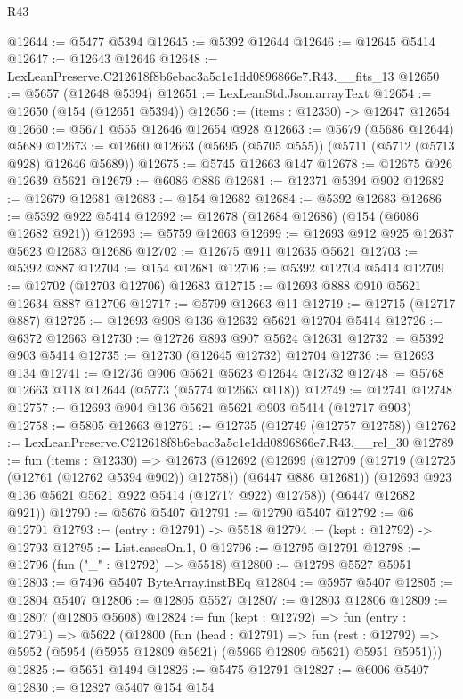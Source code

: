 \begin{lexlean}{R43}
\begin{coremodule}
@12644 := @5477 @5394
@12645 := @5392 @12644
@12646 := @12645 @5414
@12647 := @12643 @12646
@12648 := LexLeanPreserve.C212618f8b6ebac3a5c1e1dd0896866e7.R43.__fits_13
@12650 := @5657 (@12648 @5394)
@12651 := LexLeanStd.Json.arrayText
@12654 := @12650 (@154 (@12651 @5394))
@12656 := (items : @12330) -> @12647 @12654
@12660 := @5671 @555 @12646 @12654 @928
@12663 := @5679 (@5686 @12644) @5689
@12673 := @12660 @12663 (@5695 (@5705 @555)) (@5711 (@5712 (@5713 @928) @12646 @5689))
@12675 := @5745 @12663 @147
@12678 := @12675 @926 @12639 @5621
@12679 := @6086 @886
@12681 := @12371 @5394 @902
@12682 := @12679 @12681
@12683 := @154 @12682
@12684 := @5392 @12683
@12686 := @5392 @922 @5414
@12692 := @12678 (@12684 @12686) (@154 (@6086 @12682 @921))
@12693 := @5759 @12663
@12699 := @12693 @912 @925 @12637 @5623 @12683 @12686
@12702 := @12675 @911 @12635 @5621
@12703 := @5392 @887
@12704 := @154 @12681
@12706 := @5392 @12704 @5414
@12709 := @12702 (@12703 @12706) @12683
@12715 := @12693 @888 @910 @5621 @12634 @887 @12706
@12717 := @5799 @12663 @11
@12719 := @12715 (@12717 @887)
@12725 := @12693 @908 @136 @12632 @5621 @12704 @5414
@12726 := @6372 @12663
@12730 := @12726 @893 @907 @5624 @12631
@12732 := @5392 @903 @5414
@12735 := @12730 (@12645 @12732) @12704
@12736 := @12693 @134
@12741 := @12736 @906 @5621 @5623 @12644 @12732
@12748 := @5768 @12663 @118 @12644 (@5773 (@5774 @12663 @118))
@12749 := @12741 @12748
@12757 := @12693 @904 @136 @5621 @5621 @903 @5414 (@12717 @903)
@12758 := @5805 @12663
@12761 := @12735 (@12749 (@12757 @12758))
@12762 := LexLeanPreserve.C212618f8b6ebac3a5c1e1dd0896866e7.R43.__rel_30
@12789 := fun (items : @12330) =>
  @12673
    (@12692
      (@12699
        (@12709 (@12719 (@12725 (@12761 (@12762 @5394 @902)) @12758)) (@6447 @886 @12681))
        (@12693 @923 @136 @5621 @5621 @922 @5414 (@12717 @922) @12758))
      (@6447 @12682 @921))
@12790 := @5676 @5407
@12791 := @12790 @5407
@12792 := @6 @12791
@12793 := (entry : @12791) -> @5518
@12794 := (kept : @12792) -> @12793
@12795 := List.casesOn.{1, 0}
@12796 := @12795 @12791
@12798 := @12796 (fun ("_" : @12792) => @5518)
@12800 := @12798 @5527 @5951
@12803 := @7496 @5407 ByteArray.instBEq
@12804 := @5957 @5407
@12805 := @12804 @5407
@12806 := @12805 @5527
@12807 := @12803 @12806
@12809 := @12807 (@12805 @5608)
@12824 := fun (kept : @12792) =>
  fun (entry : @12791) =>
  @5622
    (@12800
      (fun (head : @12791) =>
      fun (rest : @12792) => @5952 (@5954 (@5955 @12809 @5621) (@5966 @12809 @5621) @5951 @5951)))
@12825 := @5651 @1494
@12826 := @5475 @12791
@12827 := @6006 @5407
@12830 := @12827 @5407 @154 @154

\end{coremodule}
\end{lexlean}
